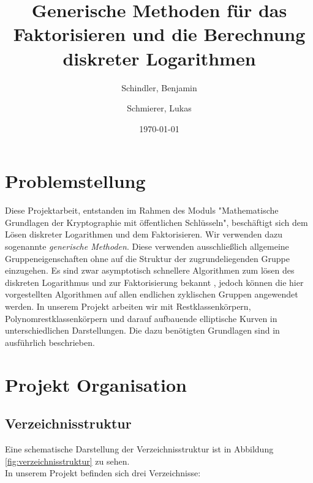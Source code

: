 \documentclass{scrartcl}
\begin{document}
\titlehead{
  Universität Leipzig \\
  Fakultät für Mathematik und Informatik \\
  Institut für Informatik
}
\subject{Projekt Dokumentation}
\title{Generische Methoden für das Faktorisieren und die Berechnung diskreter Logarithmen}
\author{Schindler, Benjamin \and Schmierer, Lukas}
\date{\today}
\publishers{Dr. Claus Diem}
\maketitle

\tableofcontents

\section{Problemstellung}
Diese Projektarbeit, entstanden im Rahmen des Moduls "Mathematische Grundlagen der Kryptographie mit öffentlichen Schlüsseln", beschäftigt sich dem Lösen diskreter Logarithmen und dem Faktorisieren. Wir verwenden dazu sogenannte \emph{generische Methoden}. Diese verwenden ausschließlich allgemeine Gruppeneigenschaften ohne auf die Struktur der zugrundeliegenden Gruppe einzugehen. Es sind zwar asymptotisch schnellere Algorithmen zum lösen des diskreten Logarithmus und zur Faktorisierung bekannt \cite{diem_2011, Adleman_1979, ECM, NFS}, jedoch können die hier vorgestellten Algorithmen auf allen endlichen zyklischen Gruppen angewendet werden. In unserem Projekt arbeiten wir mit Restklassenkörpern, Polynomrestklassenkörpern und darauf aufbauende elliptische Kurven in unterschiedlichen Darstellungen. Die dazu benötigten Grundlagen sind in \cite{Galbraith2012} ausführlich beschrieben. 
\section{Projekt Organisation}
\label{sec:organisation}

\subsection{Verzeichnisstruktur}
\label{sec:verzeichnisstruktur}
Eine schematische Darstellung der Verzeichnisstruktur ist in Abbildung \ref{fig:verzeichnisstruktur} zu sehen.\\
In unserem Projekt befinden sich drei Verzeichnisse:
\end{document}
